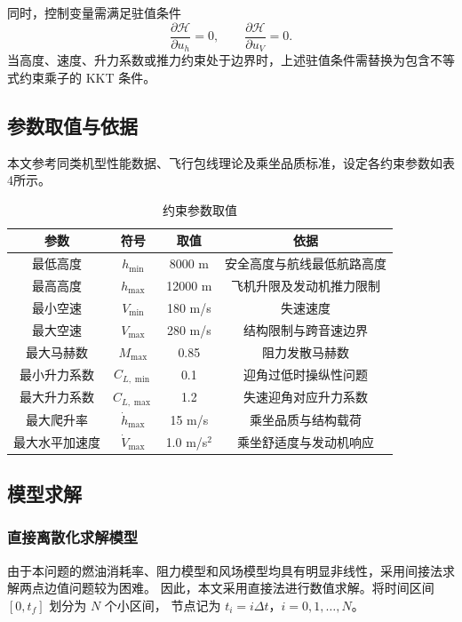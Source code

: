 \documentclass[withoutpreface,bwprint]{cumcmthesis} %
\begin{document}
同时，控制变量需满足驻值条件
\begin{equation}
    \frac{\partial \mathcal H}{\partial u_h}=0,
    \qquad
    \frac{\partial \mathcal H}{\partial u_V}=0.
    \label{eq:q3_stationary}
\end{equation}
当高度、速度、升力系数或推力约束处于边界时，上述驻值条件需替换为包含不等式约束乘子的
KKT 条件。
\subsection{参数取值与依据}
\label{sec:params}

本文参考同类机型性能数据\cite{11}\cite{12}、飞行包线理论\cite{10}及乘坐品质标准\cite{12}，设定各约束参数如表4所示。

\begin{table}[htbp]
\centering
\caption{约束参数取值}
\label{tab:const_params}
\begin{tabular}{cccc}
\toprule
参数 & 符号 & 取值 & 依据 \\
\midrule
最低高度 & $h_{\min}$ & 8000 m & 安全高度与航线最低航路高度 \\
最高高度 & $h_{\max}$ & 12000 m & 飞机升限及发动机推力限制 \\
最小空速 & $V_{\min}$ & 180 m/s & 失速速度 \\
最大空速 & $V_{\max}$ & 280 m/s & 结构限制与跨音速边界 \\
最大马赫数 & $M_{\max}$ & 0.85 & 阻力发散马赫数 \\
最小升力系数 & $C_{L,\min}$ & 0.1 & 迎角过低时操纵性问题 \\
最大升力系数 & $C_{L,\max}$ & 1.2 & 失速迎角对应升力系数 \\
最大爬升率 & $\dot h_{\max}$ & 15 m/s & 乘坐品质与结构载荷 \\
最大水平加速度 & $\dot V_{\max}$ & 1.0 m/s$^2$ & 乘坐舒适度与发动机响应 \\
\bottomrule
\end{tabular}
\end{table}
\subsection{模型求解}
\subsubsection{直接离散化求解模型}
由于本问题的燃油消耗率、阻力模型和风场模型均具有明显非线性，采用间接法求解两点边值问题较为困难。
因此，本文采用直接法进行数值求解。将时间区间 $[0,t_f]$ 划分为 $N$ 个小区间，
节点记为 $t_i=i\Delta t$，$i=0,1,\ldots,N$。
\end{document}
